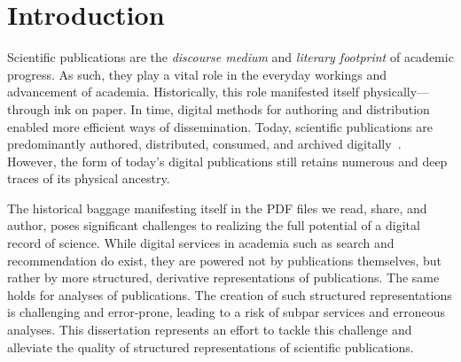 \chapter{Introduction}
\label{chp:introduction}


Scientific publications are the \emph{discourse medium} and \emph{literary footprint} of academic progress. As such, they play a vital role in the everyday workings and advancement of academia.
Historically, this role manifested itself physically---through ink on paper. In time, digital methods for authoring %
and distribution enabled more efficient ways of dissemination.
Today, scientific publications are predominantly authored, distributed, consumed, and archived digitally~\cite{Lamers2018}. However, the form of today's digital publications still retains numerous and deep traces of its physical ancestry.




The historical baggage manifesting itself in the PDF files we read, share, and author, poses significant challenges to realizing the full potential of a digital record of science. While digital services in academia such as search and recommendation do exist, they are powered not by publications themselves, but rather by more structured, derivative representations of publications. The same holds for analyses of publications. The creation of such structured representations %
is challenging and error-prone, leading to a risk of subpar services and erroneous analyses. This dissertation represents an effort to tackle this challenge and alleviate the quality of structured representations of scientific publications.

